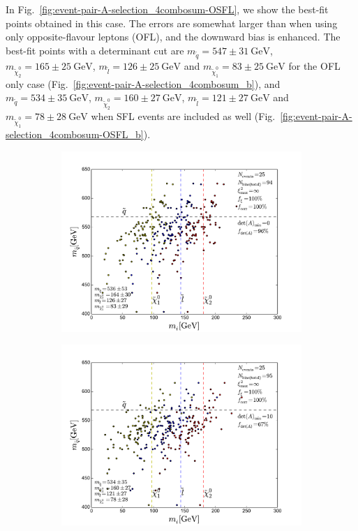 \documentclass[twoside,english]{uiofysmaster}
\begin{document}
In Fig.\ \ref{fig:event-pair-A-selection_4combosum-OSFL}, we show the best-fit points obtained in this case. The errors are somewhat larger than when using only opposite-flavour leptons (OFL), and the downward bias is enhanced. The best-fit points with a determinant cut are $m_{\tilde q} = 547 \pm 31~\mathrm{GeV}$, $m_{\tilde \chi_2^0}=165 \pm 25~\mathrm{GeV}$, $m_{\tilde l} = 126 \pm 25~\mathrm{GeV}$ and $m_{\tilde\chi_1^0} = 83 \pm 25~\mathrm{GeV}$ for the OFL only case (Fig.\ \ref{fig:event-pair-A-selection_4combosum_b}), and $m_{\tilde q} = 534 \pm 35~\mathrm{GeV}$, $m_{\tilde \chi_2^0}=160 \pm 27~\mathrm{GeV}$, $m_{\tilde l} = 121 \pm 27~\mathrm{GeV}$ and $m_{\tilde\chi_1^0} = 78 \pm 28~\mathrm{GeV}$ when SFL events are included as well (Fig.\ \ref{fig:event-pair-A-selection_4combosum-OSFL_b}).
\begin{figure}[hbt]
	\centering
	\begin{subfigure}[b]{0.45\textwidth}
		\includegraphics[width=\textwidth]{figures/improving_combinatorics/herwigpp-OSFL_nosmear_nodetAcut_A_matrix_algorithm_4combosum_TMP.pdf} 
		\caption{ }
		\label{fig:event-pair-A-selection_4combosum-OSFL_a}
	\end{subfigure}
	\begin{subfigure}[b]{0.45\textwidth}
		\includegraphics[width=\textwidth]{figures/improving_combinatorics/herwigpp-OSFL_nosmear_detAcut10_A_matrix_algorithm_4combosum_TMP.pdf}

\end{subfigure}
\end{figure}
\end{document}
